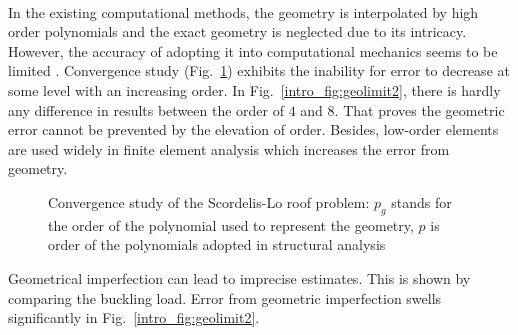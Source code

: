\paragraph{}
In the existing computational methods, the geometry is interpolated by high order polynomials and the exact geometry is neglected due to its intricacy. However, the accuracy of adopting it into computational mechanics seems to be limited \citep{Sza2004}.
Convergence study (Fig.~\ref{intro_fig:geolimit}) exhibits the inability for error to decrease at some level with an increasing order.
In Fig.~\ref{intro_fig:geolimit2}, there is hardly any difference in results between the order of $4$ and $8$.
That proves the geometric error cannot be prevented by the elevation of order.
Besides, low-order elements are used widely in finite element analysis which increases the error from geometry.
%
\begin{figure}
    \centering
    \caption[Accuracy limit in Scordelis-Lo roof problem]{Convergence study of the Scordelis-Lo roof problem: $p_g$ stands for the order of the polynomial used to represent the geometry, $p$ is order of the polynomials adopted in structural analysis \citep{Ran2005}}
    \label{intro_fig:geolimit}
\end{figure}
%
Geometrical imperfection can lead to imprecise estimates. This is shown by comparing the buckling load.
Error from geometric imperfection swells significantly in Fig.~\ref{intro_fig:geolimit2}.
%
